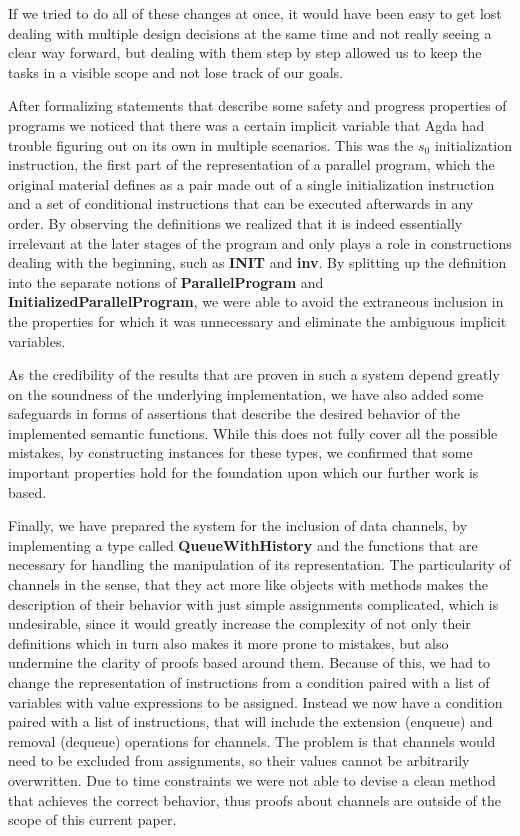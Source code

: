 
If we tried to do all of these changes at once, it would have been easy to get lost dealing with multiple design decisions at the same time and not really seeing a clear way forward, but dealing with them step by step allowed us to keep the tasks in a visible scope and not lose track of our goals.

After formalizing statements that describe some safety and progress properties of programs we noticed that there was a certain implicit variable that Agda had trouble figuring out on its own in multiple scenarios. This was the $s_0$ initialization instruction, the first part of the representation of a parallel program, which the original material defines as a pair made out of a single initialization instruction and a set of conditional instructions that can be executed afterwards in any order. By observing the definitions we realized that it is indeed essentially irrelevant at the later stages of the program and only plays a role in constructions dealing with the beginning, such as \textbf{INIT} and \textbf{inv}. By splitting up the definition into the separate notions of \textbf{ParallelProgram} and \textbf{InitializedParallelProgram}, we were able to avoid the extraneous inclusion in the properties for which it was unnecessary and eliminate the ambiguous implicit variables.

As the credibility of the results that are proven in such a system depend greatly on the soundness of the underlying implementation, we have also added some safeguards in forms of assertions that describe the desired behavior of the implemented semantic functions. While this does not fully cover all the possible mistakes, by constructing instances for these types, we confirmed that some important properties hold for the foundation upon which our further work is based.

Finally, we have prepared the system for the inclusion of data channels, by implementing a type called \textbf{QueueWithHistory} and the functions that are necessary for handling the manipulation of its representation. The particularity of channels in the sense, that they act more like objects with methods makes the description of their behavior with just simple assignments complicated, which is undesirable, since it would greatly increase the complexity of not only their definitions which in turn also makes it more prone to mistakes, but also undermine the clarity of proofs based around them. Because of this, we had to change the representation of instructions from a condition paired with a list of variables with value expressions to be assigned. Instead we now have a condition paired with a list of instructions, that will include the extension (enqueue) and removal (dequeue) operations for channels. The problem is that channels would need to be excluded from assignments, so their values cannot be arbitrarily overwritten. Due to time constraints we were not able to devise a clean method that achieves the correct behavior, thus proofs about channels are outside of the scope of this current paper.


